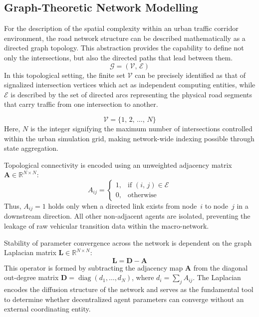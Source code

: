 \documentclass[journal]{IEEEtran}
\begin{document}
\subsection{Graph-Theoretic Network Modelling}
For the description of the spatial complexity within an urban traffic corridor environment, the road network structure can be described mathematically as a directed graph topology. This abstraction provides the capability to define not only the intersections, but also the directed paths that lead between them.
\begin{equation}
    \mathcal{G} = (\mathcal{V},\, \mathcal{E})
    \label{eq:graph}
\end{equation}
In this topological setting, the finite set $\mathcal{V}$ can be precisely identified as that of signalized intersection vertices which act as independent computing entities, while $\mathcal{E}$ is described by the set of directed arcs representing the physical road segments that carry traffic from one intersection to another.

\begin{equation}
    \mathcal{V} = \{1,\,2,\,\dots,\,N\}
    \label{eq:nodeset}
\end{equation}
Here, $N$ is the integer signifying the maximum number of intersections controlled within the urban simulation grid, making network-wide indexing possible through state aggregation.

Topological connectivity is encoded using an unweighted adjacency matrix $\mathbf{A} \in \mathbb{R}^{N \times N}$:
\begin{equation}
    A_{ij} =
    \begin{cases}
      1, & \text{if } (i,\,j) \in \mathcal{E} \\
      0, & \text{otherwise}
    \end{cases}
    \label{eq:adjacency}
\end{equation}
Thus, $A_{ij}=1$ holds only when a directed link exists from node~$i$ to node~$j$ in a downstream direction. All other non-adjacent agents are isolated, preventing the leakage of raw vehicular transition data within the macro-network.

Stability of parameter convergence across the network is dependent on the graph Laplacian matrix $\mathbf{L} \in \mathbb{R}^{N \times N}$:
\begin{equation}
    \mathbf{L} = \mathbf{D} - \mathbf{A}
    \label{eq:laplacian}
\end{equation}
This operator is formed by subtracting the adjacency map $\mathbf{A}$ from the diagonal out-degree matrix $\mathbf{D} = \operatorname{diag}(d_1,\dots,d_N)$, where $d_i = \sum_j A_{ij}$. The Laplacian encodes the diffusion structure of the network and serves as the fundamental tool to determine whether decentralized agent parameters can converge without an external coordinating entity.
\end{document}
